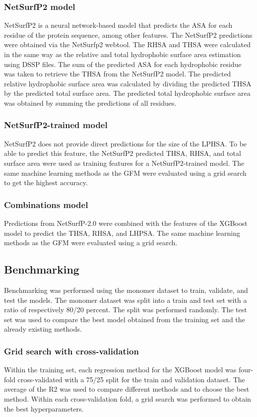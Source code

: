 \documentclass[11pt,a4paper]{article}
\begin{document}
\subsubsection{NetSurfP2 model}
NetSurfP2 is a neural network-based model that predicts the ASA for each residue of the protein sequence, among other features. The NetSurfP2 predictions were obtained via the NetSurfp2 webtool. The RHSA and THSA were calculated in the same way as the relative and total hydrophobic surface area estimation using DSSP files. The sum of the predicted ASA for each hydrophobic residue was taken to retrieve the THSA from the NetSurfP2 model.   The predicted relative hydrophobic surface area was calculated by dividing the predicted THSA by the predicted total surface area. The predicted total hydrophobic surface area was obtained by summing the predictions of all residues.

\subsubsection{NetSurfP2-trained model}

NetSurfP2 does not provide direct predictions for the size of the LPHSA. To be able to predict this feature, the NetSurfP2 predicted THSA, RHSA, and total surface area were used as training features for a NetSurfP2-trained model. The same machine learning methods as the GFM were evaluated using a grid search to get the highest accuracy.

\subsubsection{Combinations model}
Predictions from NetSurfP-2.0 were combined with the features of the XGBoost model to predict the THSA, RHSA, and LHPSA. The same machine learning methods as the GFM were evaluated using a grid search.

\subsection{Benchmarking}
Benchmarking was performed using the monomer dataset to train, validate, and test the models. The monomer dataset was split into a train and test set with a ratio of respectively 80/20 percent. The split was performed randomly. The test set was used to compare the best model obtained from the training set and the already existing methods.

\subsubsection{Grid search with cross-validation}
Within the training set, each regression method for the XGBoost model was four-fold cross-validated with a 75/25 split for the train and validation dataset. The average of the R2 was used to compare different methods and to choose the best method. Within each cross-validation fold, a grid search was performed to obtain the best hyperparameters.
\end{document}
